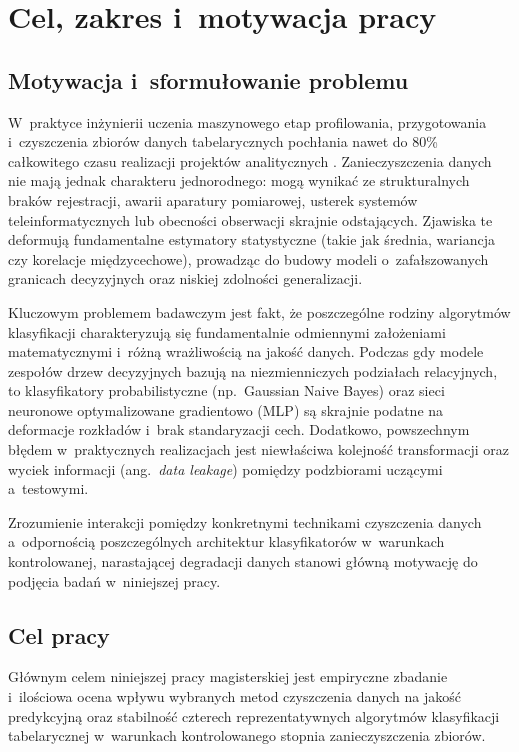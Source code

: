\chapter{Cel, zakres i~motywacja pracy}

\section{Motywacja i~sformułowanie problemu}
W~praktyce inżynierii uczenia maszynowego etap profilowania, przygotowania i~czyszczenia zbiorów danych tabelarycznych pochłania nawet do 80\% całkowitego czasu realizacji projektów analitycznych \cite{Walker2021}. Zanieczyszczenia danych nie mają jednak charakteru jednorodnego: mogą wynikać ze strukturalnych braków rejestracji, awarii aparatury pomiarowej, usterek systemów teleinformatycznych lub obecności obserwacji skrajnie odstających. Zjawiska te deformują fundamentalne estymatory statystyczne (takie jak średnia, wariancja czy korelacje międzycechowe), prowadząc do budowy modeli o~zafałszowanych granicach decyzyjnych oraz niskiej zdolności generalizacji.

Kluczowym problemem badawczym jest fakt, że poszczególne rodziny algorytmów klasyfikacji charakteryzują się fundamentalnie odmiennymi założeniami matematycznymi i~różną wrażliwością na jakość danych. Podczas gdy modele zespołów drzew decyzyjnych bazują na niezmienniczych podziałach relacyjnych, to klasyfikatory probabilistyczne (np.~Gaussian Naive Bayes) oraz sieci neuronowe optymalizowane gradientowo (MLP) są skrajnie podatne na deformacje rozkładów i~brak standaryzacji cech. Dodatkowo, powszechnym błędem w~praktycznych realizacjach jest niewłaściwa kolejność transformacji oraz wyciek informacji (ang.~\textit{data leakage}) pomiędzy podzbiorami uczącymi a~testowymi.

Zrozumienie interakcji pomiędzy konkretnymi technikami czyszczenia danych a~odpornością poszczególnych architektur klasyfikatorów w~warunkach kontrolowanej, narastającej degradacji danych stanowi główną motywację do podjęcia badań w~niniejszej pracy.

\section{Cel pracy}
Głównym celem niniejszej pracy magisterskiej jest empiryczne zbadanie i~ilościowa ocena wpływu wybranych metod czyszczenia danych na jakość predykcyjną oraz stabilność czterech reprezentatywnych algorytmów klasyfikacji tabelarycznej w~warunkach kontrolowanego stopnia zanieczyszczenia zbiorów.


